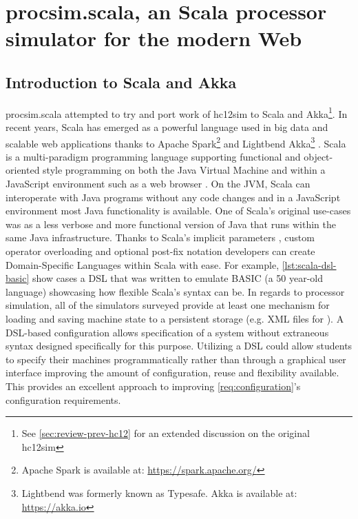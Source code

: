 \chapter{procsim.scala, an Scala processor simulator for the modern Web}
\label{ch:scala-akka}

\newcommand{\scalainline}[1]{\texttt{#1}}
\newcommand{\akkaActor}{\scalainline{Actor}}

\section{Introduction to Scala and Akka}

procsim.scala attempted to try and port work of hc12sim to Scala and Akka\footnote{See \cref{sec:review-prev-hc12} for an extended discussion on the original hc12sim}. In recent years, Scala has emerged as a powerful language used in big data and scalable web applications thanks to Apache Spark\footnote{Apache Spark is available at: \url{https://spark.apache.org/}} and Lightbend Akka\footnote{Lightbend was formerly known as Typesafe. Akka is available at: \url{https://akka.io}} \cite{Karau2015, Alexandrov2014, Singh2015}. Scala is a multi-paradigm programming language supporting functional and object-oriented style programming on both the Java Virtual Machine and within a JavaScript environment such as a web browser \cite{Scala-Lang}. On the JVM, Scala can interoperate with Java programs without any code changes and in a JavaScript environment most Java functionality is available. One of Scala's original use-cases was as a less verbose and more functional version of Java that runs within the same Java infrastructure. Thanks to Scala's implicit parameters \cite{Scala-ImplicitParameters}, custom operator overloading \cite{Scala-Operators} and optional post-fix notation \cite{Scala-MethodInvocations} developers can create Domain-Specific Languages within Scala with ease. For example, \cref{lst:scala-dsl-basic} show cases a DSL that was written to emulate BASIC (a 50 year-old language) showcasing how flexible Scala's syntax can be. In regards to processor simulation, all of the simulators surveyed provide at least one mechanism for loading and saving machine state to a persistent storage (e.g. XML files for \cite{Skrien2001, Black2013}). A DSL-based configuration allows specification of a system without extraneous syntax designed specifically for this purpose. Utilizing a DSL could allow students to specify their machines programmatically rather than through a graphical user interface improving the amount of configuration, reuse and flexibility available. This provides an excellent approach to improving \cref{req:configuration}'s configuration requirements.

